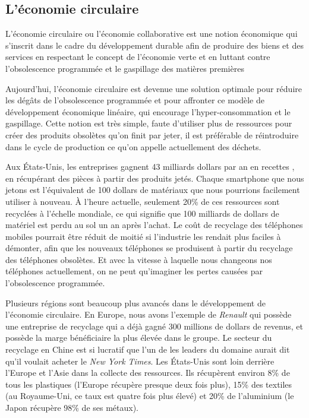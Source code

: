 \subsection{L'économie circulaire}


\bigbreak
L’économie circulaire ou l’économie collaborative est une notion économique qui s'inscrit dans le cadre du développement durable afin de produire des biens et des services en respectant le concept de l'économie verte et en luttant contre l'obsolescence programmée et le gaspillage des matières premières %


\bigbreak
Aujourd'hui, l'économie circulaire est devenue une solution optimale pour réduire les dégâts de l'obsolescence programmée et pour affronter ce modèle de développement économique linéaire, qui encourage l’hyper-consommation et le gaspillage. Cette notion est très simple, faute d'utiliser plus de ressources pour créer des produits obsolètes qu'on finit par jeter, il est préférable de réintroduire dans le cycle de production ce qu'on appelle actuellement des déchets.


\bigbreak
Aux États-Unis, les entreprises gagnent 43 milliards dollars par an en recettes \cite{usatoday}, en récupérant des pièces à partir des produits jetés. Chaque smartphone que nous jetons est l'équivalent de 100 dollars de matériaux que nous pourrions facilement utiliser à nouveau. À l'heure actuelle, seulement 20\% de ces ressources sont recyclées à l'échelle mondiale, ce qui signifie que 100 milliards de dollars de matériel est perdu au sol un an après l'achat. Le coût de recyclage des téléphones mobiles pourrait être réduit de moitié si l'industrie les rendait plus faciles à démonter, afin que les nouveaux téléphones se produisent à partir du recyclage des téléphones obsolètes. Et avec la vitesse à laquelle nous changeons nos téléphones actuellement, on ne peut qu'imaginer les pertes causées par l'obsolescence programmée.


\bigbreak
Plusieurs régions sont beaucoup plus avancés dans le développement de l'économie circulaire. En Europe, nous avons l'exemple de \textit{Renault} qui possède une entreprise de recyclage qui a déjà gagné 300 millions de dollars de revenus, et possède la marge bénéficiaire la plus élevée dans le groupe. Le secteur du recyclage en Chine est si lucratif que l'un de les leaders du domaine aurait dit qu'il voulait acheter le \textit{New York Times}. Les États-Unis sont loin derrière l'Europe et l'Asie dans la collecte des ressources. Ils récupèrent environ 8\% de tous les plastiques (l'Europe récupère presque deux fois plus), 15\% des textiles (au Royaume-Uni, ce taux est quatre fois plus élevé) et 20\% de l'aluminium (le Japon récupère 98\% de ses métaux).

